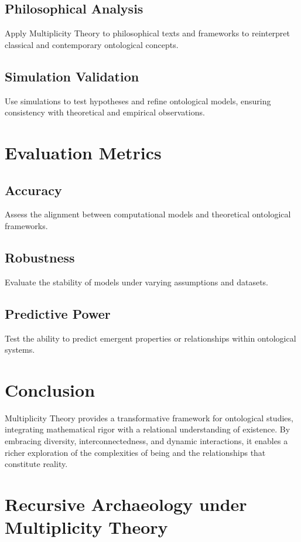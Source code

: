 \documentclass{article}
\theoremstyle{plain}
\begin{document}
\subsection{Philosophical Analysis}
Apply Multiplicity Theory to philosophical texts and frameworks to reinterpret classical and contemporary ontological concepts.

\subsection{Simulation Validation}
Use simulations to test hypotheses and refine ontological models, ensuring consistency with theoretical and empirical observations.

\section{Evaluation Metrics}

\subsection{Accuracy}
Assess the alignment between computational models and theoretical ontological frameworks.

\subsection{Robustness}
Evaluate the stability of models under varying assumptions and datasets.

\subsection{Predictive Power}
Test the ability to predict emergent properties or relationships within ontological systems.

\section{Conclusion}
Multiplicity Theory provides a transformative framework for ontological studies, integrating mathematical rigor with a relational understanding of existence. By embracing diversity, interconnectedness, and dynamic interactions, it enables a richer exploration of the complexities of being and the relationships that constitute reality.

\section{Recursive Archaeology under Multiplicity Theory}
\label{sec:recursive-archaeology}
\end{document}
